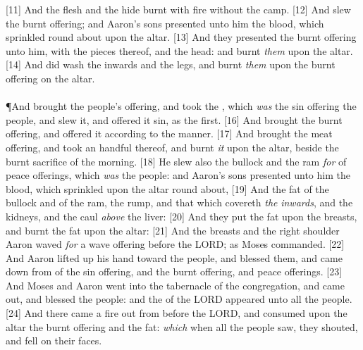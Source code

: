 [11] \textcolor[cmyk]{0.99998,1,0,0}{And the flesh and the hide  burnt with fire without the camp.}
[12] \textcolor[cmyk]{0.99998,1,0,0}{And  slew the burnt offering; and Aaron's sons presented unto him the blood, which  sprinkled round about upon the altar.}
[13] \textcolor[cmyk]{0.99998,1,0,0}{And they presented the burnt offering unto him, with the pieces thereof, and the head: and  burnt \emph{them} upon the altar.}
[14] \textcolor[cmyk]{0.99998,1,0,0}{And  did wash the inwards and the legs, and burnt \emph{them} upon the burnt offering on the altar.}\\
\\
\P \textcolor[cmyk]{0.99998,1,0,0}{And  brought the people's offering, and took the , which \emph{was} the sin offering   the people, and slew it, and offered it   sin, as the first.}
[16] \textcolor[cmyk]{0.99998,1,0,0}{And  brought the burnt offering, and offered it according to the manner.}
[17] \textcolor[cmyk]{0.99998,1,0,0}{And  brought the meat offering, and took an handful thereof, and burnt \emph{it} upon the altar, beside the burnt sacrifice of the morning.}
[18] \textcolor[cmyk]{0.99998,1,0,0}{He slew also the bullock and the ram \emph{for}  of peace offerings, which \emph{was}   the people: and Aaron's sons presented unto him the blood, which  sprinkled upon the altar round about,}
[19] \textcolor[cmyk]{0.99998,1,0,0}{And the fat of the bullock and of the ram, the rump, and that which covereth \emph{the} \emph{inwards}, and the kidneys, and the caul \emph{above} the liver:}
[20] \textcolor[cmyk]{0.99998,1,0,0}{And they put the fat upon the breasts, and  burnt the fat upon the altar:}
[21] \textcolor[cmyk]{0.99998,1,0,0}{And the breasts and the right shoulder Aaron waved \emph{for} a wave offering before the LORD; as Moses commanded.}
[22] \textcolor[cmyk]{0.99998,1,0,0}{And Aaron lifted up his hand toward the people, and blessed them, and came down from  of the sin offering, and the burnt offering, and peace offerings.}
[23] \textcolor[cmyk]{0.99998,1,0,0}{And Moses and Aaron went into the tabernacle of the congregation, and came out, and blessed the people: and the  of the LORD appeared unto all the people.}
[24] \textcolor[cmyk]{0.99998,1,0,0}{And there came a fire out from before the LORD, and consumed upon the altar the burnt offering and the fat: \emph{which} when all the people saw, they shouted, and fell on their faces.}